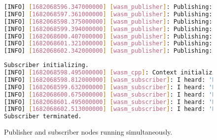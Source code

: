         \begin{figure}[htbp]
            \centering
            \vspace{1em}

            \begin{lstlisting}[language=bash]
[INFO] [1682068596.347000000] [wasm_publisher]: Publishing: 'Hello there! 16'
[INFO] [1682068597.361000000] [wasm_publisher]: Publishing: 'Hello there! 17'
[INFO] [1682068598.375000000] [wasm_publisher]: Publishing: 'Hello there! 18'
[INFO] [1682068599.394000000] [wasm_publisher]: Publishing: 'Hello there! 19'
[INFO] [1682068600.407000000] [wasm_publisher]: Publishing: 'Hello there! 20'
[INFO] [1682068601.321000000] [wasm_publisher]: Publishing: 'Hello there! 21'
[INFO] [1682068602.342000000] [wasm_publisher]: Publishing: 'Hello there! 22'
\end{lstlisting}

            \vspace{1em}
            \vspace{1em}

            \begin{lstlisting}[language=bash]
Subscriber initializing.
[INFO] [1682068598.495000000] [wasm_cpp]: Context initializing.
[INFO] [1682068598.812000000] [wasm_subscriber]: I heard: 'Hello there! 18'
[INFO] [1682068599.632000000] [wasm_subscriber]: I heard: 'Hello there! 19'
[INFO] [1682068600.675000000] [wasm_subscriber]: I heard: 'Hello there! 20'
[INFO] [1682068601.495000000] [wasm_subscriber]: I heard: 'Hello there! 21'
[INFO] [1682068602.513000000] [wasm_subscriber]: I heard: 'Hello there! 22'
Subscriber terminated.
\end{lstlisting}

            \caption{Publisher and subscriber nodes running simultaneously.}\label{fig:ui3}
        \end{figure}

